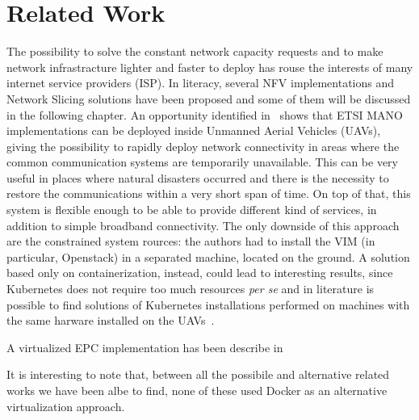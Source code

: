 \chapter{Related Work}
\label{chap:rel_wk}

The possibility to solve the constant network capacity requests and to make
network infrastracture lighter and faster to deploy has rouse the interests of
many internet service providers (ISP). In literacy, several NFV implementations
and Network Slicing solutions have been proposed and some of them will be
discussed in the following chapter. An opportunity identified
in~\cite{nogales2018nfv} shows that ETSI MANO implementations can be deployed
inside Unmanned Aerial Vehicles (UAVs), giving the possibility to rapidly deploy
network connectivity in areas where the common communication systems are
temporarily unavailable. This can be very useful in places where natural
disasters occurred and there is the necessity to restore the communications
within a very short span of time. On top of that, this system is flexible enough
to be able to provide different kind of services, in addition to simple
broadband connectivity. The only downside of this approach are the constrained
system rources: the authors had to install the VIM (in particular, Openstack) in
a separated machine, located on the ground. A solution based only on
containerization, instead, could lead to interesting results, since Kubernetes
does not require too much resources \textit{per se} and in literature is
possible to find solutions of Kubernetes installations performed on machines
with the same harware installed on the UAVs~\cite{pahl2016container}.

A virtualized EPC implementation has been describe in~\cite{hawilo2014nfv}



It is interesting to note that, between all the possibile and alternative
related works we have been albe to find, none of these used Docker as an
alternative virtualization approach.
